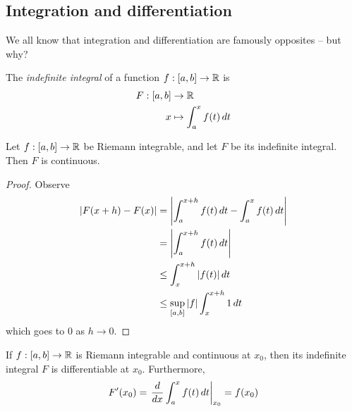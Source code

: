 \documentclass{../../template/note}
\begin{document}
    \subsection{Integration and differentiation}

    We all know that integration and differentiation are famously opposites -- but why?

    \begin{definition}
        The \emph{indefinite integral} of a function \(f: [a, b] \to \mathbb R\) is
        \begin{align*}
            F: [a, b] &\to \mathbb R \\
            x &\mapsto \int_a^x f(t) \,d{t}
        \end{align*}
    \end{definition}
    
    \begin{proposition}
        Let \(f: [a, b] \to \mathbb R\) be Riemann integrable, and let \(F\) be its indefinite integral. Then \(F\) is continuous.
    \end{proposition}
    
    \begin{proof}
        Observe
        \begin{align*}
            |F(x+h)-F(x)| &= \left|\int_a^{x+h} f(t) \,d{t} - \int_a^x f(t) \,d{t} \right| \\
            &= \left|\int_a^{x+h} f(t) \,d{t}\right| \\
            &\leq \int_x^{x+h} |f(t)| \,d{t} \\
            &\leq \sup_{[a,b]} |f| \int_x^{x+h} 1 \,d{t}
        \end{align*}
        which goes to 0 as \(h \to 0\).
    \end{proof}
    
    \begin{theorem}
        \label{ftc-1}
        If \(f: [a, b] \to \mathbb R\) is Riemann integrable and continuous at \(x_0\), then its indefinite integral \(F\) is differentiable at \(x_0\). Furthermore,
        \begin{align*}
            F'(x_0) = \left.\frac{d}{dx} \int_a^x f(t) \,d{t}\right|_{x_0} = f(x_0)
        \end{align*}
    \end{theorem}
    
\end{document}
